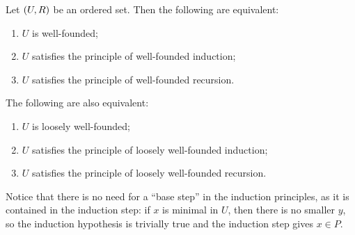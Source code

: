 \begin{theorem}
Let $\sSet{U, R}$ be an ordered set. Then the following are equivalent:
\begin{enumerate}
\item $U$ is well-founded;
\item $U$ satisfies the principle of well-founded induction;
\item $U$ satisfies the principle of well-founded recursion.
\end{enumerate}
The following are also equivalent:
\begin{enumerate}
\item $U$ is loosely well-founded;
\item $U$ satisfies the principle of loosely well-founded induction;
\item $U$ satisfies the principle of loosely well-founded recursion.
\end{enumerate}
\end{theorem}
Notice that there is no need for a ``base step'' in the induction principles, as it is 
contained in the induction step: if $x$ is minimal in $U$, then there is no smaller $y$, so the induction hypothesis is trivially true and the induction step gives $x\in P$.
